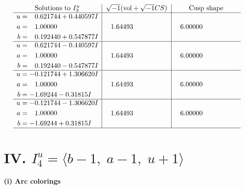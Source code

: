 \documentclass[1p]{elsarticle_modified}
\theoremstyle{definition}
\newcommand{\I}{\sqrt{-1}}
\begin{document}
$$\begin{array}{c|c|c}  
\text{Solutions to }I^u_{3}& \I (\text{vol} + \sqrt{-1}CS) & \text{Cusp shape}\\
 \hline 
\begin{aligned}
u &= \phantom{-}0.621744 + 0.440597 I \\
a &= \phantom{-}1.00000\phantom{ +0.000000I} \\
b &= \phantom{-}0.192440 + 0.547877 I\end{aligned}
 & \phantom{-}1.64493\phantom{ +0.000000I} & \phantom{-}6.00000\phantom{ +0.000000I} \\ \hline\begin{aligned}
u &= \phantom{-}0.621744 - 0.440597 I \\
a &= \phantom{-}1.00000\phantom{ +0.000000I} \\
b &= \phantom{-}0.192440 - 0.547877 I\end{aligned}
 & \phantom{-}1.64493\phantom{ +0.000000I} & \phantom{-}6.00000\phantom{ +0.000000I} \\ \hline\begin{aligned}
u &= -0.121744 + 1.306620 I \\
a &= \phantom{-}1.00000\phantom{ +0.000000I} \\
b &= -1.69244 - 0.31815 I\end{aligned}
 & \phantom{-}1.64493\phantom{ +0.000000I} & \phantom{-}6.00000\phantom{ +0.000000I} \\ \hline\begin{aligned}
u &= -0.121744 - 1.306620 I \\
a &= \phantom{-}1.00000\phantom{ +0.000000I} \\
b &= -1.69244 + 0.31815 I\end{aligned}
 & \phantom{-}1.64493\phantom{ +0.000000I} & \phantom{-}6.00000\phantom{ +0.000000I}\\
 \hline 
 \end{array}$$\newpage\newpage\renewcommand{\arraystretch}{1}
\centering \section*{IV. $I^u_{4}= \langle b-1,\;a-1,\;u+1 \rangle$}
\flushleft \textbf{(i) Arc colorings}\\
\end{document}
